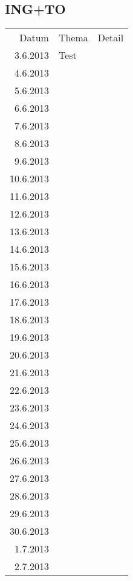 \subsection{ING+TO}
\begin{tabular}{r l p{}}
\rowcolor{lgray} Datum     & Thema         & Detail \\
\rowcolor{white}  3.6.2013 & Test          &  \\
\rowcolor{lgray}  4.6.2013 &               &  \\
\rowcolor{white}  5.6.2013 &               &  \\
\rowcolor{lgray}  6.6.2013 &               &  \\
\rowcolor{white}  7.6.2013 &               &  \\
\rowcolor{lgray}  8.6.2013 &               &  \\
\rowcolor{white}  9.6.2013 &               &  \\
\rowcolor{lgray} 10.6.2013 &               &  \\
\rowcolor{white} 11.6.2013 &               &  \\
\rowcolor{lgray} 12.6.2013 &               &  \\
\rowcolor{white} 13.6.2013 &               &  \\
\rowcolor{lgray} 14.6.2013 &               &  \\
\rowcolor{white} 15.6.2013 &               &  \\
\rowcolor{lgray} 16.6.2013 &               &  \\
\rowcolor{white} 17.6.2013 &               &  \\
\rowcolor{lgray} 18.6.2013 &               &  \\
\rowcolor{white} 19.6.2013 &               &  \\
\rowcolor{lgray} 20.6.2013 &               &  \\
\rowcolor{white} 21.6.2013 &               &  \\
\rowcolor{lgray} 22.6.2013 &               &  \\
\rowcolor{white} 23.6.2013 &               &  \\
\rowcolor{lgray} 24.6.2013 &               &  \\
\rowcolor{white} 25.6.2013 &               &  \\
\rowcolor{lgray} 26.6.2013 &               &  \\
\rowcolor{white} 27.6.2013 &               &  \\
\rowcolor{lgray} 28.6.2013 &               &  \\
\rowcolor{white} 29.6.2013 &               &  \\
\rowcolor{lgray} 30.6.2013 &               &  \\
\rowcolor{white}  1.7.2013 &               &  \\
\rowcolor{lgray}  2.7.2013 &               &  \\
\end{tabular}

